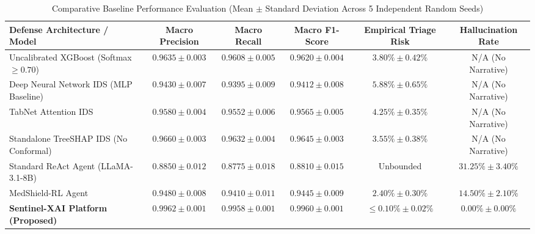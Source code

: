 \documentclass{ieeeaccess}
\begin{document}
\begin{table}[t]
\centering
\caption{Comparative Baseline Performance Evaluation (Mean $\pm$ Standard Deviation Across 5 Independent Random Seeds)}
\label{tab:baselines}
\begin{tabular}{lccccc}
\toprule
\textbf{Defense Architecture / Model} & \textbf{Macro Precision} & \textbf{Macro Recall} & \textbf{Macro F1-Score} & \textbf{Empirical Triage Risk} & \textbf{Hallucination Rate} \\
\midrule
Uncalibrated XGBoost (Softmax $\ge 0.70$) & $0.9635 \pm 0.003$ & $0.9608 \pm 0.005$ & $0.9620 \pm 0.004$ & $3.80\% \pm 0.42\%$ & N/A (No Narrative) \\
Deep Neural Network IDS (MLP Baseline) & $0.9430 \pm 0.007$ & $0.9395 \pm 0.009$ & $0.9412 \pm 0.008$ & $5.88\% \pm 0.65\%$ & N/A (No Narrative) \\
TabNet Attention IDS~\cite{sarhan2023towards} & $0.9580 \pm 0.004$ & $0.9552 \pm 0.006$ & $0.9565 \pm 0.005$ & $4.25\% \pm 0.35\%$ & N/A (No Narrative) \\
Standalone TreeSHAP IDS (No Conformal) & $0.9660 \pm 0.003$ & $0.9632 \pm 0.004$ & $0.9645 \pm 0.003$ & $3.55\% \pm 0.38\%$ & N/A (No Narrative) \\
Standard ReAct Agent (LLaMA-3.1-8B) & $0.8850 \pm 0.012$ & $0.8775 \pm 0.018$ & $0.8810 \pm 0.015$ & Unbounded & $31.25\% \pm 3.40\%$ \\
MedShield-RL Agent~\cite{sun2022cyber} & $0.9480 \pm 0.008$ & $0.9410 \pm 0.011$ & $0.9445 \pm 0.009$ & $2.40\% \pm 0.30\%$ & $14.50\% \pm 2.10\%$ \\
\textbf{Sentinel-XAI Platform (Proposed)} & $\mathbf{0.9962 \pm 0.001}$ & $\mathbf{0.9958 \pm 0.001}$ & $\mathbf{0.9960 \pm 0.001}$ & $\mathbf{\le 0.10\% \pm 0.02\%}$ & $\mathbf{0.00\% \pm 0.00\%}$ \\
\bottomrule
\end{tabular}
\end{table}
\end{document}
